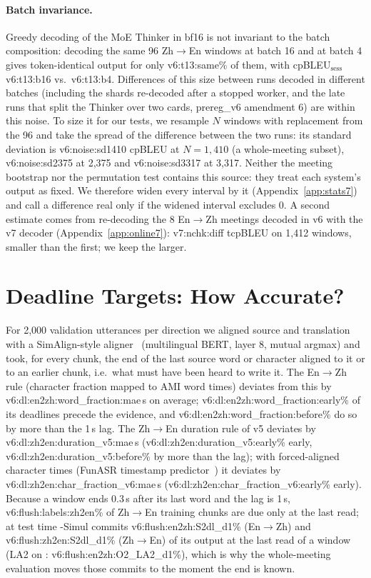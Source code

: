 \paragraph{Batch invariance.} Greedy decoding of the MoE Thinker in bf16 is not invariant to the batch composition:
decoding the same 96 Zh$\rightarrow$En windows at batch 16 and at batch 4 gives token-identical output for only
\num{v6:t13:same}\% of them, with cpBLEU$_\text{sess}$ \num{v6:t13:b16} vs.\ \num{v6:t13:b4}. Differences of this size between
runs decoded in different batches (including the shards re-decoded after a stopped worker, and the late runs that split the
Thinker over two cards, prereg\_v6 amendment 6) are within this noise. To size it for our tests, we resample $N$
windows with replacement from the 96 and take the spread of the difference between the two runs: its standard deviation is
\num{v6:noise:sd1410} cpBLEU at $N{=}1{,}410$ (a whole-meeting subset), \num{v6:noise:sd2375} at 2{,}375 and \num{v6:noise:sd3317}
at 3{,}317. Neither the meeting bootstrap nor the permutation test contains this source: they treat each system's output as
fixed. We therefore widen every interval by it (Appendix~\ref{app:stats7}) and call a difference real only if the widened
interval excludes 0. A second estimate comes from re-decoding the 8 En$\rightarrow$Zh meetings decoded in v6 with the v7
decoder (Appendix~\ref{app:online7}): \num{v7:nchk:diff} tcpBLEU on 1{,}412 windows, smaller than the first; we keep the
larger.

\section{Deadline Targets: How Accurate?}
\label{app:deadline}

For 2{,}000 validation utterances per direction we aligned source and translation with a SimAlign-style
aligner~\citep{jalili2021simalign} (multilingual BERT, layer 8, mutual argmax) and took, for every chunk, the end of the
last source word or character aligned to it or to an earlier chunk, i.e.\ what must have been heard to write it. The
En$\rightarrow$Zh rule (character fraction mapped to AMI word times) deviates from this by \num{v6:dl:en2zh:word_fraction:mae}\,s
on average; \num{v6:dl:en2zh:word_fraction:early}\% of its deadlines precede the evidence, and
\num{v6:dl:en2zh:word_fraction:before}\% do so by more than the 1\,s lag. The Zh$\rightarrow$En duration rule of v5 deviates by
\num{v6:dl:zh2en:duration_v5:mae}\,s (\num{v6:dl:zh2en:duration_v5:early}\% early, \num{v6:dl:zh2en:duration_v5:before}\% by
more than the lag); with forced-aligned character times (FunASR timestamp predictor~\citep{gao2023funasr}) it deviates by
\num{v6:dl:zh2en:char_fraction_v6:mae}\,s (\num{v6:dl:zh2en:char_fraction_v6:early}\% early). Because a window ends 0.3\,s
after its last word and the lag is 1\,s, \num{v6:flush:labels:zh2en}\% of Zh$\rightarrow$En training chunks are due only at
the last read; at test time \sys{}-Simul commits \num{v6:flush:en2zh:S2dl_d1}\% (En$\rightarrow$Zh) and
\num{v6:flush:zh2en:S2dl_d1}\% (Zh$\rightarrow$En) of its output at the last read of a window (LA2 on \sys{}:
\num{v6:flush:en2zh:O2_LA2_d1}\%), which is why the whole-meeting evaluation moves those commits to the moment the end
is known.

